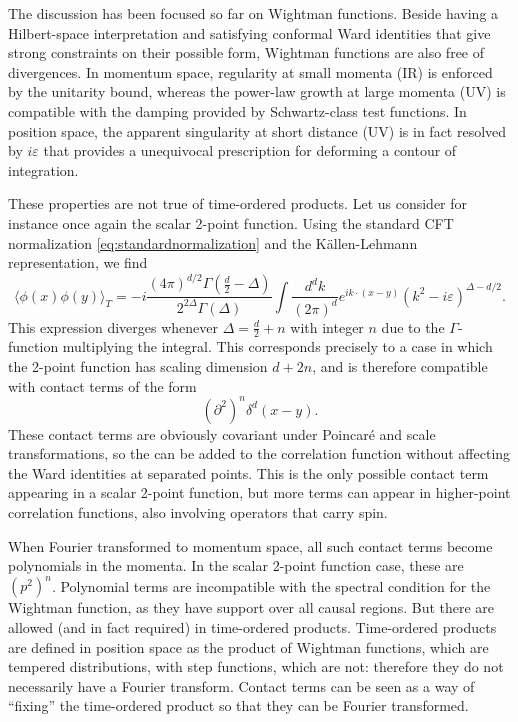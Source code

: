 \documentclass[a4paper,12pt]{article}
\numberwithin{equation}{section}
\begin{document}
The discussion has been focused so far on Wightman functions. Beside having a Hilbert-space interpretation and satisfying conformal Ward identities that give strong constraints on their possible form, Wightman functions are also free of divergences.
In momentum space, regularity at small momenta (IR) is enforced by the unitarity bound, whereas the power-law growth at large momenta (UV) is compatible with the damping provided by Schwartz-class test functions.
In position space, the apparent singularity at short distance (UV) is in fact resolved by $i \varepsilon$ that provides a unequivocal prescription for deforming a contour of integration.

These properties are not true of time-ordered products. Let us consider for instance once again the scalar 2-point function. Using the standard CFT normalization \eqref{eq:standardnormalization} and the Källen-Lehmann representation, we find
\begin{equation}
	\langle \phi(x) \phi(y) \rangle_T
	= -i
	\frac{(4\pi)^{d/2} \Gamma\left( \frac{d}{2} - \Delta \right)}
	{2^{2\Delta} \Gamma(\Delta)}
	\int \frac{d^dk}{(2\pi)^d}
	e^{i k \cdot (x - y)}
	\left( k^2 - i \varepsilon \right)^{\Delta - d/2}.
	\label{eq:UVdivergence}
\end{equation}
This expression diverges whenever $\Delta = \frac{d}{2} + n$ with integer $n$ due to the $\Gamma$-function multiplying the integral.
This corresponds precisely to a case in which the 2-point function has scaling dimension $d + 2n$, and is therefore compatible with contact terms of the form
\begin{equation}
	(\partial^2)^n \delta^d(x - y).
\end{equation}
These contact terms are obviously covariant under Poincaré and scale transformations, so the can be added to the correlation function without affecting the Ward identities at separated points.
This is the only possible contact term appearing in a scalar 2-point function, but more terms can appear in higher-point correlation functions, also involving operators that carry spin.

When Fourier transformed to momentum space, all such contact terms become polynomials in the momenta. In the scalar 2-point function case, these are $(p^2)^n$. Polynomial terms are incompatible with the spectral condition for the Wightman function, as they have support over all causal regions. But there are allowed (and in fact required) in time-ordered products. Time-ordered products are defined in position space as the product of Wightman functions, which are tempered distributions, with step functions, which are not: therefore they do not necessarily have a Fourier transform. Contact terms can be seen as a way of ``fixing'' the time-ordered product so that they can be Fourier transformed. 
\end{document}
